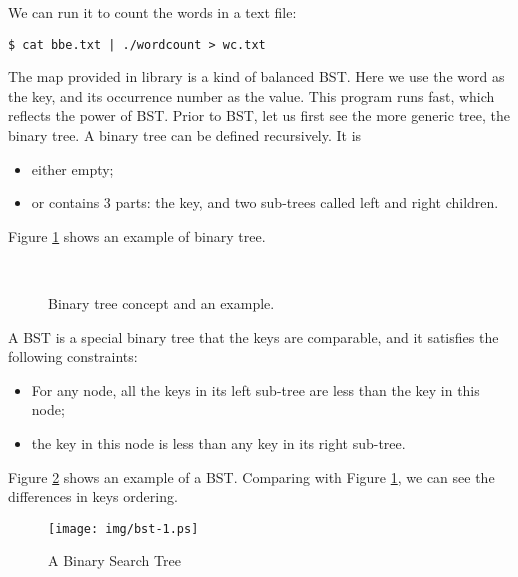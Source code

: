 \documentclass{article}
\begin{document}
We can run it to count the words in a text file:

\begin{verbatim}
$ cat bbe.txt | ./wordcount > wc.txt
\end{verbatim}

The map provided in library is a kind of balanced BST. Here we use the word as the key, and its occurrence number as the value. This program runs fast, which reflects the power of BST. Prior to BST, let us first see the more generic tree, the binary tree. A binary tree can be defined recursively. It is


\begin{itemize}
\item either empty;
\item or contains 3 parts: the key, and two sub-trees called left and right children.
\end{itemize}

Figure \ref{fig:binary-tree-example} shows an example of binary tree.

\begin{figure}[htbp]
  \centering
   \\
  \caption{Binary tree concept and an example.}
  \label{fig:binary-tree-example}
\end{figure}

A BST is a special binary tree that the keys are comparable, and it satisfies the following constraints:

\begin{itemize}
\item For any node, all the keys in its left sub-tree are less than the key in this node;
\item the key in this node is less than any key in its right sub-tree.
\end{itemize}

Figure \ref{fig:bst-example} shows an example of a BST. Comparing with Figure \ref{fig:binary-tree-example}, we can see the differences in keys ordering.

\begin{figure}[htbp]
       \begin{center}
        \texttt{[image: img/bst-1.ps]}
        \caption{A Binary Search Tree} \label{fig:bst-example}
       \end{center}
\end{figure}
\end{document}
